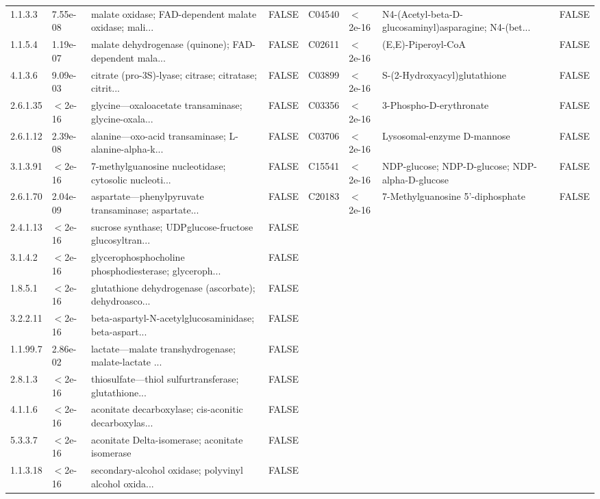\documentclass{article}\usepackage[]{graphicx}\usepackage[]{color}
\begin{document}
{{\begin{tabular}{llllllll}
  1.1.3.3 &  7.55e-08 & malate oxidase; FAD-dependent malate oxidase; mali... & FALSE & C04540 & $<$2e-16 & N4-(Acetyl-beta-D-glucosaminyl)asparagine; N4-(bet... & FALSE \\ 
  1.1.5.4 &  1.19e-07 & malate dehydrogenase (quinone); FAD-dependent mala... & FALSE & C02611 & $<$2e-16 & (E,E)-Piperoyl-CoA & FALSE \\ 
  4.1.3.6 &  9.09e-03 & citrate (pro-3S)-lyase; citrase; citratase; citrit... & FALSE & C03899 & $<$2e-16 & S-(2-Hydroxyacyl)glutathione & FALSE \\ 
  2.6.1.35 & $<$2e-16 & glycine---oxaloacetate transaminase; glycine-oxala... & FALSE & C03356 & $<$2e-16 & 3-Phospho-D-erythronate & FALSE \\ 
  2.6.1.12 &  2.39e-08 & alanine---oxo-acid transaminase; L-alanine-alpha-k... & FALSE & C03706 & $<$2e-16 & Lysosomal-enzyme D-mannose & FALSE \\ 
  3.1.3.91 & $<$2e-16 & 7-methylguanosine nucleotidase; cytosolic nucleoti... & FALSE & C15541 & $<$2e-16 & NDP-glucose; NDP-D-glucose; NDP-alpha-D-glucose & FALSE \\ 
  2.6.1.70 &  2.04e-09 & aspartate---phenylpyruvate transaminase; aspartate... & FALSE & C20183 & $<$2e-16 & 7-Methylguanosine 5'-diphosphate & FALSE \\ 
  2.4.1.13 & $<$2e-16 & sucrose synthase; UDPglucose-fructose glucosyltran... & FALSE &  &  &  &  \\ 
  3.1.4.2 & $<$2e-16 & glycerophosphocholine phosphodiesterase; glyceroph... & FALSE &  &  &  &  \\ 
  1.8.5.1 & $<$2e-16 & glutathione dehydrogenase (ascorbate); dehydroasco... & FALSE &  &  &  &  \\ 
  3.2.2.11 & $<$2e-16 & beta-aspartyl-N-acetylglucosaminidase; beta-aspart... & FALSE &  &  &  &  \\ 
  1.1.99.7 &  2.86e-02 & lactate---malate transhydrogenase; malate-lactate ... & FALSE &  &  &  &  \\ 
  2.8.1.3 & $<$2e-16 & thiosulfate---thiol sulfurtransferase; glutathione... & FALSE &  &  &  &  \\ 
  4.1.1.6 & $<$2e-16 & aconitate decarboxylase; cis-aconitic decarboxylas... & FALSE &  &  &  &  \\ 
  5.3.3.7 & $<$2e-16 & aconitate Delta-isomerase; aconitate isomerase & FALSE &  &  &  &  \\ 
  1.1.3.18 & $<$2e-16 & secondary-alcohol oxidase; polyvinyl alcohol oxida... & FALSE &  &  &  &  \\ 

\end{tabular}}}
\end{document}
